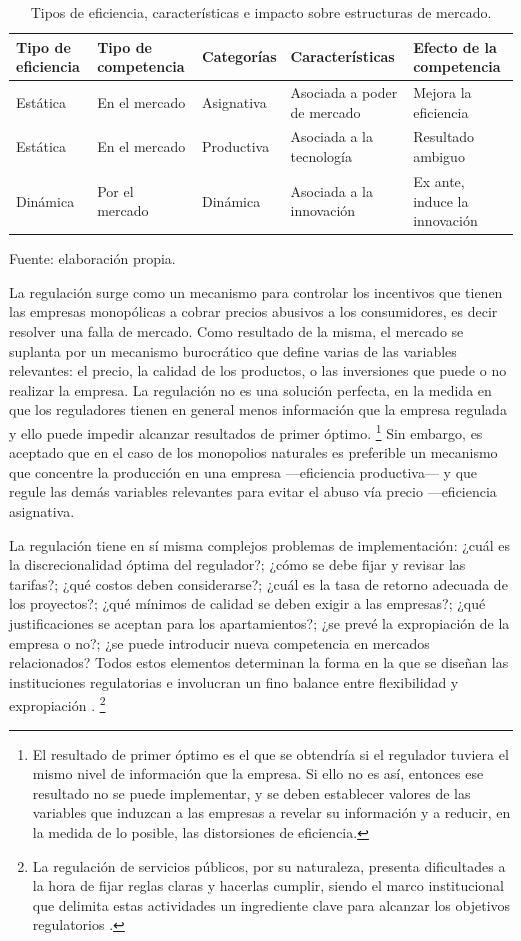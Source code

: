 \documentclass[
  12pt,
  spanish,
]{book}
\begin{document}
\begin{table}

\caption{\label{tab:cuadro1}Tipos de eficiencia, características e impacto sobre estructuras de mercado.}
\centering
\begin{tabular}[t]{l|l|l|l|l}
\hline
Tipo de eficiencia & Tipo de competencia & Categorías & Características & Efecto de la competencia\\
\hline
Estática & En el mercado & Asignativa & Asociada a poder de mercado & Mejora la eficiencia\\
\hline
Estática & En el mercado & Productiva & Asociada a la tecnología & Resultado ambiguo\\
\hline
Dinámica & Por el mercado & Dinámica & Asociada a la innovación & Ex ante, induce la innovación\\
\hline
\end{tabular}
\end{table}

Fuente: elaboración propia.

La regulación surge como un mecanismo para controlar los incentivos que tienen las empresas monopólicas a cobrar precios abusivos a los consumidores, es decir resolver una falla de mercado. Como resultado de la misma, el mercado se suplanta por un mecanismo burocrático que define varias de las variables relevantes: el precio, la calidad de los productos, o las inversiones que puede o no realizar la empresa. La regulación no es una solución perfecta, en la medida en que los reguladores tienen en general menos información que la empresa regulada y ello puede impedir alcanzar resultados de primer óptimo.
\footnote{El resultado de primer óptimo es el que se obtendría si el regulador tuviera el mismo nivel de información que la empresa. Si ello no es así, entonces ese resultado no se puede implementar, y se deben establecer valores de las variables que induzcan a las empresas a revelar su información y a reducir, en la medida de lo posible, las distorsiones de eficiencia.}
Sin embargo, es aceptado que en el caso de los monopolios naturales es preferible un mecanismo que concentre la producción en una empresa ---eficiencia productiva--- y que regule las demás variables relevantes para evitar el abuso vía precio ---eficiencia asignativa.

La regulación tiene en sí misma complejos problemas de implementación: ¿cuál es la discrecionalidad óptima del regulador?; ¿cómo se debe fijar y revisar las tarifas?; ¿qué costos deben considerarse?; ¿cuál es la tasa de retorno adecuada de los proyectos?; ¿qué mínimos de calidad se deben exigir a las empresas?; ¿qué justificaciones se aceptan para los apartamientos?; ¿se prevé la expropiación de la empresa o no?; ¿se puede introducir nueva competencia en mercados relacionados? Todos estos elementos determinan la forma en la que se diseñan las instituciones regulatorias e involucran un fino balance entre flexibilidad y expropiación \citep{Bergara2003, Spiller2013}.
\footnote{La regulación de servicios públicos, por su naturaleza, presenta dificultades a la hora de fijar reglas claras y hacerlas cumplir, siendo el marco institucional que delimita estas actividades un ingrediente clave para alcanzar los objetivos regulatorios \citep{Bergara2003}.}
\end{document}

